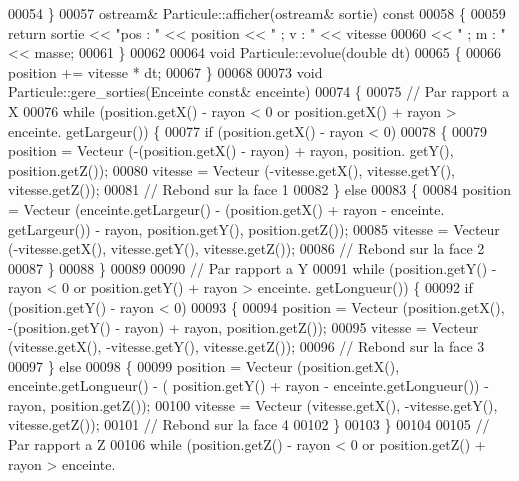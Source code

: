 \begin{DoxyCode}
00054 \}
00057 ostream& Particule::afficher(ostream& sortie)\textcolor{keyword}{ const}
00058 \textcolor{keyword}{}\{
00059     \textcolor{keywordflow}{return} sortie << \textcolor{stringliteral}{"pos : "} << position << \textcolor{stringliteral}{" ; v : "} << vitesse
00060                   << \textcolor{stringliteral}{" ; m : "} << masse;
00061 \}
00062 
00064 \textcolor{keywordtype}{void} Particule::evolue(\textcolor{keywordtype}{double} dt)
00065 \{
00066     position += vitesse * dt;
00067 \}
00068 
00073 \textcolor{keywordtype}{void} Particule::gere_sorties(Enceinte \textcolor{keyword}{const}& enceinte)
00074 \{
00075     \textcolor{comment}{// Par rapport a X}
00076     \textcolor{keywordflow}{while} (position.getX() - rayon < 0 or position.getX() + rayon > enceinte.
      getLargeur()) \{
00077         \textcolor{keywordflow}{if} (position.getX() - rayon < 0)
00078         \{
00079             position = Vecteur (-(position.getX() - rayon) + rayon, position.
      getY(), position.getZ());
00080             vitesse = Vecteur (-vitesse.getX(), vitesse.getY(), vitesse.getZ());
00081             \textcolor{comment}{// Rebond sur la face 1}
00082         \} \textcolor{keywordflow}{else}
00083         \{
00084             position = Vecteur (enceinte.getLargeur() - (position.getX() + rayon - enceinte.
      getLargeur()) - rayon, position.getY(), position.getZ());
00085             vitesse = Vecteur (-vitesse.getX(), vitesse.getY(), vitesse.getZ());
00086             \textcolor{comment}{// Rebond sur la face 2}
00087         \}
00088     \}
00089  
00090     \textcolor{comment}{// Par rapport a Y}
00091     \textcolor{keywordflow}{while} (position.getY() - rayon < 0 or position.getY() + rayon > enceinte.
      getLongueur()) \{
00092         \textcolor{keywordflow}{if} (position.getY() - rayon < 0)
00093         \{
00094             position = Vecteur (position.getX(), -(position.getY() - rayon) + 
      rayon, position.getZ());
00095             vitesse = Vecteur (vitesse.getX(), -vitesse.getY(), vitesse.getZ());
00096             \textcolor{comment}{// Rebond sur la face 3}
00097         \} \textcolor{keywordflow}{else}
00098         \{
00099             position = Vecteur (position.getX(), enceinte.getLongueur() - (
      position.getY() + rayon - enceinte.getLongueur()) - rayon, position.getZ());
00100             vitesse = Vecteur (vitesse.getX(), -vitesse.getY(), vitesse.getZ());
00101             \textcolor{comment}{// Rebond sur la face 4}
00102         \}
00103     \}
00104     
00105     \textcolor{comment}{// Par rapport a Z}
00106     \textcolor{keywordflow}{while} (position.getZ() - rayon < 0 or position.getZ() + rayon > enceinte.

\end{DoxyCode}
